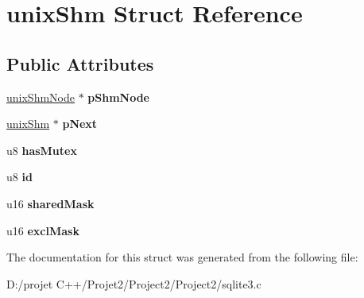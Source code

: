\hypertarget{structunix_shm}{}\section{unix\+Shm Struct Reference}
\label{structunix_shm}
\subsection*{Public Attributes}
\begin{DoxyCompactItemize}
\item 
\mbox{\label{structunix_shm_a8ab421232d29e3237262ef46775199ee}} 
\mbox{\hyperlink{structunix_shm_node}{unix\+Shm\+Node}} $\ast$ {\bfseries p\+Shm\+Node}
\item 
\mbox{\label{structunix_shm_a0d5229cf734581f51cdf16dd7d5ce93a}} 
\mbox{\hyperlink{structunix_shm}{unix\+Shm}} $\ast$ {\bfseries p\+Next}
\item 
\mbox{\label{structunix_shm_a43903be262472299c5eee917ba7c523c}} 
u8 {\bfseries has\+Mutex}
\item 
\mbox{\label{structunix_shm_a88a5e7161ff31f85740dbfc0ba7ad38a}} 
u8 {\bfseries id}
\item 
\mbox{\label{structunix_shm_a768aa62a6ea2bd91ab60a34d7654811b}} 
u16 {\bfseries shared\+Mask}
\item 
\mbox{\label{structunix_shm_ac6f786d95952e51cab941cbfb9243c8e}} 
u16 {\bfseries excl\+Mask}
\end{DoxyCompactItemize}


The documentation for this struct was generated from the following file\+:\begin{DoxyCompactItemize}
\item 
D\+:/projet C++/\+Projet2/\+Project2/\+Project2/sqlite3.\+c\end{DoxyCompactItemize}
